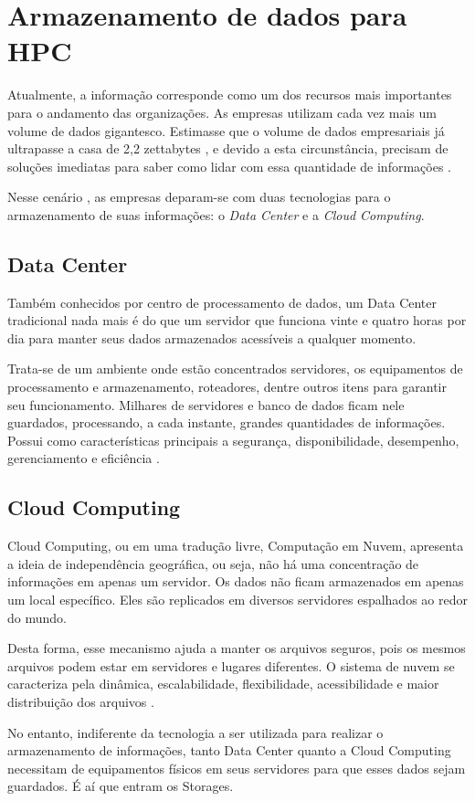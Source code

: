 \section{Armazenamento de dados para HPC}

Atualmente, a informação corresponde como um dos recursos mais importantes para o andamento das organizações. As empresas utilizam cada vez mais um volume de dados gigantesco. Estimasse que o volume de dados empresariais já ultrapasse a casa de 2,2 zettabytes , e devido a esta circunstância, precisam de soluções imediatas para saber como lidar com essa quantidade de informações .

Nesse cenário , as empresas deparam-se com duas tecnologias para o armazenamento de suas informações: o \textit{Data Center} e a \textit{Cloud Computing}.

\subsection*{Data Center}
Também conhecidos por centro de processamento de dados, um Data Center tradicional nada mais é do que um servidor que funciona vinte e quatro horas por dia para manter seus dados armazenados acessíveis a qualquer momento.

Trata-se de um ambiente onde estão concentrados servidores, os equipamentos de processamento e armazenamento, roteadores, dentre outros itens para garantir seu funcionamento. Milhares de servidores e banco de dados ficam nele guardados, processando, a cada instante, grandes quantidades de informações. Possui como características principais a segurança, disponibilidade, desempenho, gerenciamento e eficiência .


\subsection*{Cloud Computing}
Cloud Computing, ou em uma tradução livre, Computação em Nuvem, apresenta a ideia de independência geográfica, ou seja, não há uma concentração de informações em apenas um servidor. Os dados não ficam armazenados em apenas um local específico. Eles são replicados em diversos servidores espalhados ao redor do mundo.

Desta forma, esse mecanismo ajuda a manter os arquivos seguros, pois os mesmos arquivos podem estar em servidores e lugares diferentes. O sistema de nuvem se caracteriza pela dinâmica, escalabilidade, flexibilidade, acessibilidade e maior distribuição dos arquivos .

No entanto, indiferente da tecnologia a ser utilizada para realizar o armazenamento de informações, tanto Data Center quanto a Cloud Computing necessitam de equipamentos físicos em seus servidores para que esses dados sejam guardados. É aí que entram os Storages.



